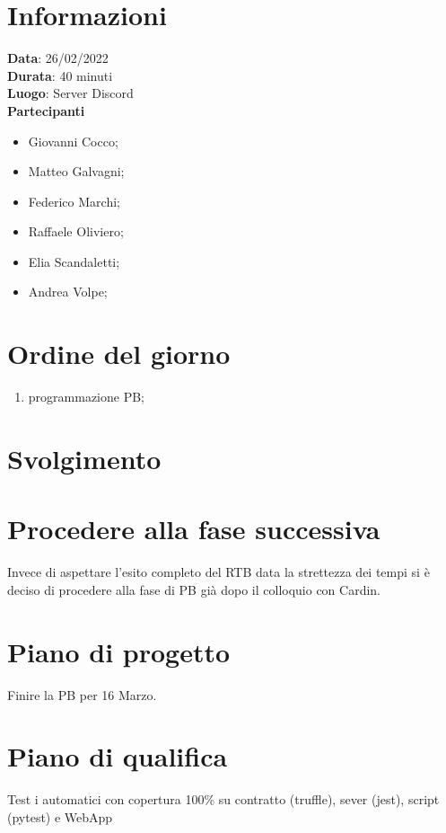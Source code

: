 \documentclass[a4paper, 12pt]{article}
\begin{document}
\makefrontpage

\section{Informazioni}
\textbf{Data}: 26/02/2022\\
\textbf{Durata}: 40 minuti\\
\textbf{Luogo}: Server Discord\\

\textbf{Partecipanti}
\begin{itemize}
	\item Giovanni Cocco;
	\item Matteo Galvagni;
	\item Federico Marchi;
	\item Raffaele Oliviero;
	\item Elia Scandaletti;
	\item Andrea Volpe;
\end{itemize}

\section{Ordine del giorno}
\begin{enumerate}
	\item programmazione PB;

\end{enumerate}

\section{Svolgimento}
\section{Procedere alla fase successiva}
Invece di aspettare l'esito completo del RTB data la strettezza dei tempi si è deciso di procedere alla fase di PB già dopo il colloquio con Cardin.

\section{Piano di progetto}
Finire la PB per 16 Marzo.

\section{Piano di qualifica}
Test i automatici con copertura 100\% su contratto (truffle), sever (jest), script (pytest) e WebApp
\end{document}
